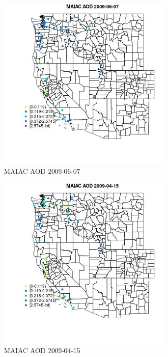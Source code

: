 \begin{figure} 
\centering  
\includegraphics[width=0.77\textwidth]{Code_Outputs/Report_ML_input_PM25_Step4_part_e_de_duplicated_aves_MapObsMAIAC_AOD2009-06-07.jpg} 
\caption{\label{fig:Report_ML_input_PM25_Step4_part_e_de_duplicated_avesMapObsMAIAC_AOD2009-06-07}MAIAC AOD 2009-06-07} 
\end{figure} 
 

\begin{figure} 
\centering  
\includegraphics[width=0.77\textwidth]{Code_Outputs/Report_ML_input_PM25_Step4_part_e_de_duplicated_aves_MapObsMAIAC_AOD2009-04-15.jpg} 
\caption{\label{fig:Report_ML_input_PM25_Step4_part_e_de_duplicated_avesMapObsMAIAC_AOD2009-04-15}MAIAC AOD 2009-04-15} 
\end{figure} 
 

